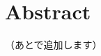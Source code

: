 \documentclass[../main]{subfiles}
\begin{document}
\setcounter{secnumdepth}{2}
\chapter*{Abstract}
（あとで追加します）
\end{document}
